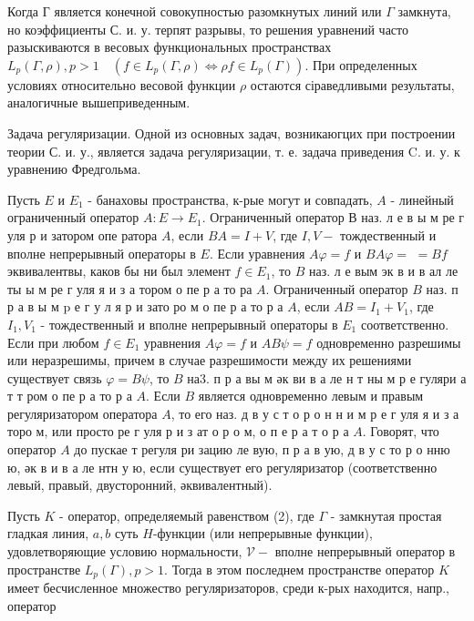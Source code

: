 \documentclass[10pt]{article}
\begin{document}
Когда Г является конечной совокупностью разомкнутых линий или $\Gamma$ замкнута, но коэффициенты С. и. у. терпят разрывы, то решения уравнений часто разыскиваются в весовых функциональных пространствах $L_{p}(\Gamma, \rho), p>1 \quad\left(f \in L_{p}(\Gamma, \rho) \Longleftrightarrow \rho f \in L_{p}(\Gamma)\right)$. При определенных условиях относительно весовой функции $\rho$ остаются сіраведливыми результаты, аналогичные вышеприведенным.



Задача регуляризации. Одной из основных задач, возникаюгцих при построении теории С. и. у., является задача регуляризации, т. е. задача приведения C. и. у. к уравнению Фредгольма.



Пусть $E$ и $E_{1}$ - банаховы пространства, к-рые могут и совпадать, $A$ - линейный ограниченный оператор $A: E \rightarrow E_{1}$. Ограниченный оператор В наз. л е в ы м ре г уля р и затором опе ратора $A$, если $B A=I+V$, где $I, V-$ тождественный и вполне непрерывный операторы в $E$. Если уравнения $A \varphi=f$ и $B A \varphi=$ $=B f$ эквивалентвы, каков бы ни был элемент $f \in E_{1}$, то $B$ наз. л е вым эк в и в ал ле ты ы м ре г уля я и з а тором о пе р а то ра $A$. Ограниченный оператор $B$ наз. п р а в ы м $\mathrm{p}$ е г у л я р и зато ро м о пе р а то р а $A$, если $A B=I_{1}+V_{1}$, где $I_{1}, V_{1}$ - тождественный и вполне непрерывный операторы в $E_{1}$ соответственно. Если при любом $f \in E_{1}$ уравнения $A \varphi=f$ и $A B \psi=f$ одновременно разрешимы или неразрешимы, причем в случае разрешимости между их решениями существует связь $\varphi=B \psi$, то $B$ на3. п р а вы м әк ви в а ле н т ны м р е гуляри а т т ром о пе р а то р а $A$. Если $B$ является одновременно левым и правым регуляризатором оператора $A$, то его наз. д в у с т о р о н н и м р е г уля я и з а торо м, или просто ре г уля р и з ат о р о м, о п е р а т о р а $A$. Говорят, что оператор $A$ до пускае т регуля ри зацию ле вую, п р а в ую, д в у с то р о нню ю, әк в и в а ле нтн у ю, если существует его регуляризатор (соответственно левый, правый, двусторонний, әквивалентный).



Пусть $K$ - оператор, определяемый равенством (2), где $\Gamma$ - замкнутая простая гладкая линия, $a, b$ суть $H$-функции (или непрерывные функции), удовлетворяющие условию нормальности, $\mathscr{V}-$ вполне непрерывный оператор в пространстве $L_{p}(\Gamma), p>1$. Тогда в этом последнем пространстве оператор $K$ имеет бесчисленное множество регуляризаторов, среди к-рых находится, напр., оператор
\end{document}
